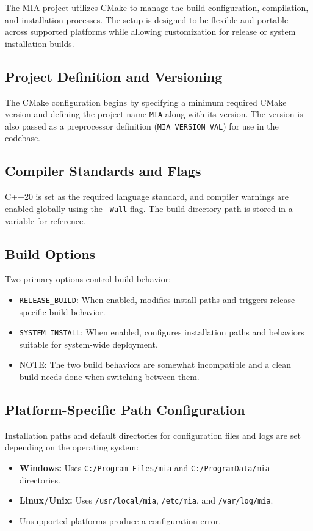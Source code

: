 The MIA project utilizes CMake to manage the build configuration, compilation, and installation processes. The setup is designed to be flexible and portable across supported platforms while allowing customization for release or system installation builds.

\subsection{Project Definition and Versioning}

The CMake configuration begins by specifying a minimum required CMake version and defining the project name \texttt{MIA} along with its version. The version is also passed as a preprocessor definition (\texttt{MIA\_VERSION\_VAL}) for use in the codebase.

\subsection{Compiler Standards and Flags}

C++20 is set as the required language standard, and compiler warnings are enabled globally using the \texttt{-Wall} flag. The build directory path is stored in a variable for reference.

\subsection{Build Options}

Two primary options control build behavior:
\begin{itemize}
	\item \texttt{RELEASE\_BUILD}: When enabled, modifies install paths and triggers release-specific build behavior.
	\item \texttt{SYSTEM\_INSTALL}: When enabled, configures installation paths and behaviors suitable for system-wide deployment.
	\item NOTE: The two build behaviors are somewhat incompatible and a clean build needs done when switching between them.
\end{itemize}

\subsection{Platform-Specific Path Configuration}

Installation paths and default directories for configuration files and logs are set depending on the operating system:
\begin{itemize}
	\item \textbf{Windows:} Uses \texttt{C:/Program Files/mia} and \texttt{C:/ProgramData/mia} directories.
	\item \textbf{Linux/Unix:} Uses \texttt{/usr/local/mia}, \texttt{/etc/mia}, and \texttt{/var/log/mia}.
	\item Unsupported platforms produce a configuration error.
\end{itemize}

